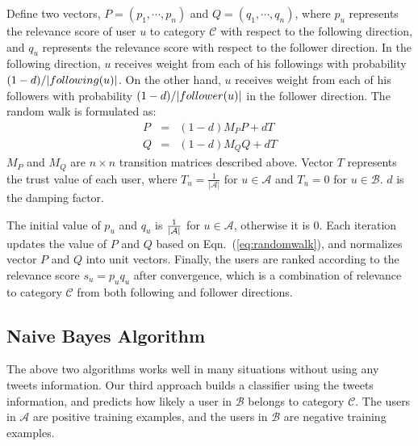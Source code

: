 \documentclass{article}
\begin{document}
Define two vectors, $P = (p_1, \cdots, p_n)$ and $Q = (q_1, \cdots, q_n)$, where $p_u$ represents the relevance score of user $u$ to category $\mathcal{C}$ with respect to the following direction, and $q_u$ represents the relevance score with respect to the follower direction.
In the following direction, $u$ receives weight from each of his followings with probability $(1 - d) / |following(u)|$. On the other hand, $u$ receives weight from each of his followers with probability $(1 - d) / |follower(u)|$ in the follower direction. The random walk is formulated as:
\begin{eqnarray}\label{eq:randomwalk}
P & = & (1 - d) M_P P + d T \nonumber \\
Q & = & (1 - d) M_Q Q + d T
\end{eqnarray}
$M_P$ and $M_Q$ are $n \times n$ transition matrices described above. Vector $T$ represents the trust value of each user, where $T_u = \frac{1}{|\mathcal{A}|}$ for $u \in \mathcal{A}$ and $T_u = 0$ for $u \in \mathcal{B}$. $d$ is the damping factor.

The initial value of $p_u$ and $q_u$ is ${1 \over |\mathcal{A}|}$ for $u \in \mathcal{A}$, otherwise it is 0. Each iteration updates the value of $P$ and $Q$ based on Eqn.~(\ref{eq:randomwalk}), and normalizes vector $P$ and $Q$ into unit vectors. Finally, the users are ranked according to the relevance score $s_u = p_u q_u$ after convergence, which is a combination of relevance to category $\mathcal{C}$ from both following and follower directions.

\subsection{Naive Bayes Algorithm}

The above two algorithms works well in many situations without using any tweets information. %
Our third approach builds a classifier using the tweets information, and predicts how likely a user in $\mathcal{B}$ belongs to category $\mathcal{C}$. The users in $\mathcal{A}$ are positive training examples, and the users in $\mathcal{B}$ are negative training examples.
\end{document}
